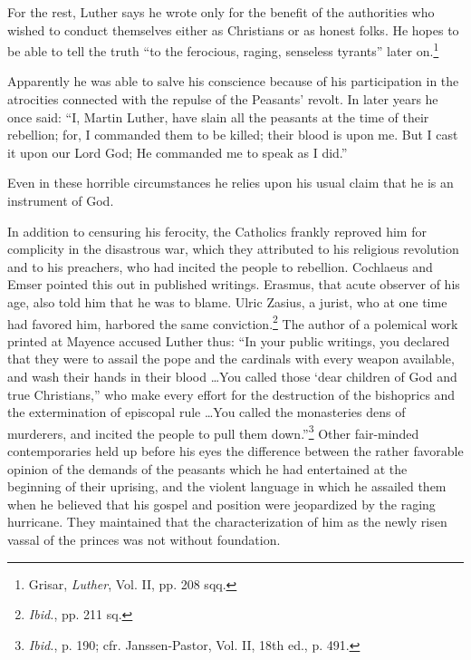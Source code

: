 For the rest, Luther says he wrote only for the benefit of the authorities
who wished to conduct themselves either as Christians or as honest folks.
He hopes to be able to tell the truth “to the ferocious, raging, senseless
tyrants” later on.\footnote{Grisar, \textit{Luther}, Vol. II, pp. 208 sqq.}

Apparently he was able to salve his conscience because of his participation
in the atrocities connected with the repulse of the Peasants’ revolt.
In later years he once said: “I, Martin Luther, have slain all the peasants
at the time of their rebellion; for, I commanded them to be killed; their
blood is upon me. But I cast it upon our Lord God; He commanded me to
speak as I did.”

Even in these horrible circumstances he relies upon his usual claim that he
is an instrument of God.

In addition to censuring his ferocity, the Catholics frankly reproved
him for complicity in the disastrous war, which they attributed to his
religious revolution and to his preachers, who had incited the people
to rebellion. Cochlaeus and Emser pointed this out in
published writings. Erasmus, that acute observer of his age, also told
him that he was to blame. Ulric Zasius, a jurist, who at one time had
favored him, harbored the same conviction.\footnote{\textit{Ibid.}, pp. 211 sq.}
The author of a polemical
work printed at Mayence accused Luther thus: “In your public writings,
you declared that they were to assail the pope and the
cardinals with every weapon available, and wash their hands in their
blood \dots You called those ‘dear children of God and true Christians,”
who make every effort for the destruction of the bishoprics and
the extermination of episcopal rule \dots You called the monasteries
dens of murderers, and incited the people to pull them down.”\footnote
{\textit{Ibid.}, p. 190; cfr. Janssen-Pastor, Vol. II, 18th ed., p. 491.}
Other
fair-minded contemporaries held up before his eyes the difference
between the rather favorable opinion of the demands of the peasants
which he had entertained at the beginning of their uprising, and the
violent language in which he assailed them when he believed that his
gospel and position were jeopardized by the raging hurricane. They
maintained that the characterization of him as the newly risen vassal
of the princes was not without foundation.


